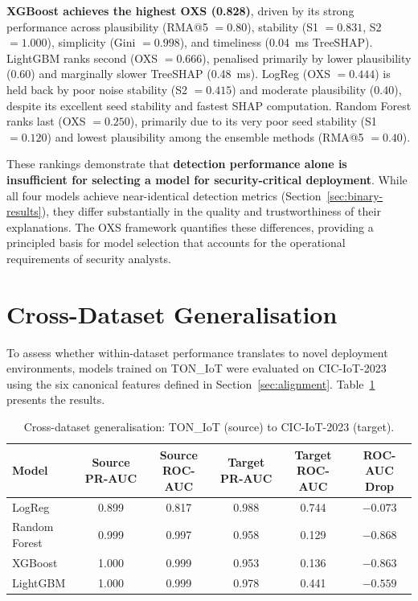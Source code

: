 \documentclass[12pt,a4paper]{report}
\begin{document}
\textbf{XGBoost achieves the highest OXS (0.828)}, driven by its strong performance across plausibility (RMA@5 $= 0.80$), stability (S1 $= 0.831$, S2 $= 1.000$), simplicity (Gini $= 0.998$), and timeliness (0.04~ms TreeSHAP). LightGBM ranks second (OXS $= 0.666$), penalised primarily by lower plausibility (0.60) and marginally slower TreeSHAP (0.48~ms). LogReg (OXS $= 0.444$) is held back by poor noise stability (S2 $= 0.415$) and moderate plausibility (0.40), despite its excellent seed stability and fastest SHAP computation. Random Forest ranks last (OXS $= 0.250$), primarily due to its very poor seed stability (S1 $= 0.120$) and lowest plausibility among the ensemble methods (RMA@5 $= 0.40$).

These rankings demonstrate that \textbf{detection performance alone is insufficient for selecting a model for security-critical deployment}. While all four models achieve near-identical detection metrics (Section~\ref{sec:binary-results}), they differ substantially in the quality and trustworthiness of their explanations. The OXS framework quantifies these differences, providing a principled basis for model selection that accounts for the operational requirements of security analysts.

\section{Cross-Dataset Generalisation}
\label{sec:cross-results}

To assess whether within-dataset performance translates to novel deployment environments, models trained on TON\_IoT were evaluated on CIC-IoT-2023 \citep{cic2023} using the six canonical features defined in Section~\ref{sec:alignment}. Table~\ref{tab:cross} presents the results.

\begin{table}[H]
\centering
\caption{Cross-dataset generalisation: TON\_IoT (source) to CIC-IoT-2023 (target).}
\label{tab:cross}
\begin{tabular}{lccccc}
\toprule
\textbf{Model} & \textbf{Source PR-AUC} & \textbf{Source ROC-AUC} & \textbf{Target PR-AUC} & \textbf{Target ROC-AUC} & \textbf{ROC-AUC Drop} \\
\midrule
LogReg & 0.899 & 0.817 & 0.988 & 0.744 & $-0.073$ \\
Random Forest & 0.999 & 0.997 & 0.958 & 0.129 & $-0.868$ \\
XGBoost & 1.000 & 0.999 & 0.953 & 0.136 & $-0.863$ \\
LightGBM & 1.000 & 0.999 & 0.978 & 0.441 & $-0.559$ \\
\bottomrule
\end{tabular}
\end{table}
\end{document}
